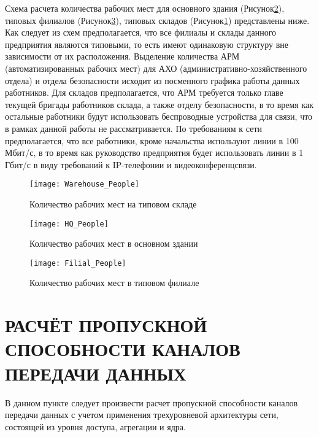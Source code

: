 \documentclass[14pt, a4paper]{extarticle}
\begin{document}
Схема расчета количества рабочих мест для основного здания
(Рисунок\;\ref{fig:hq_people}), типовых филиалов
(Рисунок\;\ref{fig:filial_people}), типовых складов
(Рисунок\;\ref{fig:warehouse_people}) представлены ниже. Как следует
из схем предполагается, что все филиалы и склады данного предприятия
являются типовыми, то есть имеют одинаковую структуру вне зависимости от
их расположения. Выделение количества АРМ (автоматизированных рабочих
мест) для АХО (административно-хозяйственного отдела) и отдела
безопасности исходит из посменного графика работы данных
работников. Для складов предполагается, что АРМ требуется только главе
текущей бригады работников склада, а также отделу безопасности, в то
время как остальные работники будут использовать беспроводные
устройства для связи, что в рамках данной работы не
рассматривается. По требованиям к сети предполагается, что все
работники, кроме начальства используют линии в 100 Мбит/с, в то время
как руководство предприятия будет использовать линии в 1 Гбит/с в виду
требований к IP-телефонии и видеоконференцсвязи.

\begin{figure}[H]
  \centering
  \texttt{[image: Warehouse\_People]}
  \caption{Количество рабочих мест на типовом складе}
  \label{fig:warehouse_people}
\end{figure}

\begin{figure}[H]
  \centering
  \texttt{[image: HQ\_People]}
  \caption{Количество рабочих мест в основном здании}
  \label{fig:hq_people}
\end{figure}


\begin{figure}[H]
  \centering
  \texttt{[image: Filial\_People]}
  \caption{Количество рабочих мест в типовом филиале}
  \label{fig:filial_people}
\end{figure}

\section{РАСЧЁТ ПРОПУСКНОЙ СПОСОБНОСТИ КАНАЛОВ ПЕРЕДАЧИ ДАННЫХ}
В данном пункте следует произвести расчет пропускной способности
каналов передачи данных с учетом применения трехуровневой архитектуры
сети, состоящей из уровня доступа, агрегации и ядра.
\end{document}
